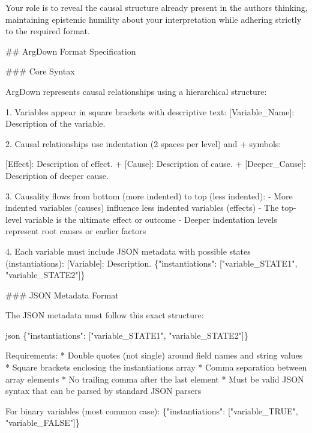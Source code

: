 \documentclass[
  11pt,
  letterpaper,
  openany]{book}
\newenvironment{Shaded}{\begin{snugshade}}{\end{snugshade}}
\newcommand{\StringTok}[1]{\textcolor[rgb]{0.13,0.47,0.30}{#1}}
\begin{document}
\begin{landscape}
\begin{Shaded}
\begin{Highlighting}[]
\StringTok{Your role is to reveal the causal structure already present in the author\textquotesingle{}s}
\StringTok{thinking, maintaining epistemic humility about your interpretation while}
\StringTok{adhering strictly to the required format.}

\StringTok{\#\# ArgDown Format Specification}

\StringTok{\#\#\# Core Syntax}

\StringTok{ArgDown represents causal relationships using a hierarchical structure:}

\StringTok{1. Variables appear in square brackets with descriptive text:}
\StringTok{   \textasciigrave{}[Variable\_Name]: Description of the variable.\textasciigrave{}}

\StringTok{2. Causal relationships use indentation (2 spaces per level) and \textquotesingle{}+\textquotesingle{} symbols:}

\StringTok{[Effect]: Description of effect. + [Cause]: Description of cause. + [Deeper\_Cause]: Description of deeper cause.}

\StringTok{3. Causality flows from bottom (more indented) to top (less indented):}
\StringTok{{-} More indented variables (causes) influence less indented variables (effects)}
\StringTok{{-} The top{-}level variable is the ultimate effect or outcome}
\StringTok{{-} Deeper indentation levels represent root causes or earlier factors}

\StringTok{4. Each variable must include JSON metadata with possible states (instantiations):}
\StringTok{\textasciigrave{}[Variable]: Description. \{"instantiations": ["variable\_STATE1", "variable\_STATE2"]\}\textasciigrave{}}

\StringTok{\#\#\# JSON Metadata Format}

\StringTok{The JSON metadata must follow this exact structure:}

\StringTok{\textasciigrave{}\textasciigrave{}\textasciigrave{}json}
\StringTok{\{"instantiations": ["variable\_STATE1", "variable\_STATE2"]\}}

\StringTok{Requirements:}
\StringTok{* Double quotes (not single) around field names and string values}
\StringTok{* Square brackets enclosing the instantiations array}
\StringTok{* Comma separation between array elements}
\StringTok{* No trailing comma after the last element}
\StringTok{* Must be valid JSON syntax that can be parsed by standard JSON parsers}

\StringTok{For binary variables (most common case):}
\StringTok{\{"instantiations": ["variable\_TRUE", "variable\_FALSE"]\}}


\end{Highlighting}
\end{Shaded}
\end{landscape}
\end{document}
